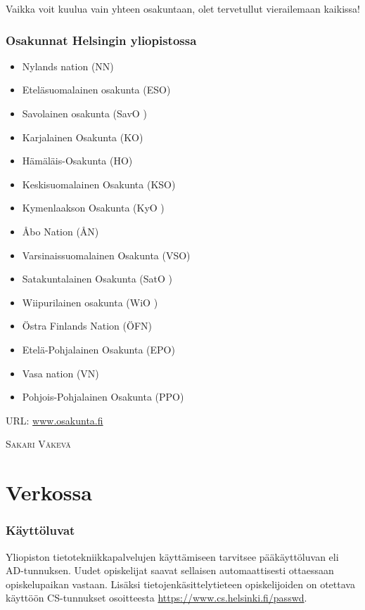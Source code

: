 \documentclass[a5paper, 8pt, twocolumn]{book} %
\numberwithin{equation}{section}
\begin{document}
Vaikka voit kuulua vain yhteen osakuntaan, olet tervetullut vierailemaan kaikissa!

\subsection*{Osakunnat Helsingin yliopistossa}
\begin{itemize}
	\item Nylands nation (NN)
	\item Eteläsuomalainen osakunta (ESO)
	\item Savolainen osakunta (SavO )
	\item Karjalainen Osakunta (KO)
	\item Hämäläis-Osakunta (HO)
	\item Keskisuomalainen Osakunta (KSO)
	\item Kymenlaakson Osakunta (KyO )
	\item Åbo Nation (ÅN)
	\item Varsinaissuomalainen Osakunta (VSO)
	\item Satakuntalainen Osakunta (SatO )
	\item Wiipurilainen osakunta (WiO )
	\item Östra Finlands Nation (ÖFN)
	\item Etelä-Pohjalainen Osakunta (EPO)
	\item Vasa nation (VN)
	\item Pohjois-Pohjalainen Osakunta (PPO)
\end{itemize}

\noindent URL: \url{www.osakunta.fi}

\vspace{0.5cm}\noindent\textsc{Sakari Väkevä}
\chapter{Verkossa}
\begin{figure}[!b]\end{figure}
\subsection*{Käyttöluvat}
Yliopiston tieto\-tekniikka\-palvelujen käyttämiseen
tarvitsee pää\-käyttö\-luvan eli AD-tunnuksen. Uudet
opiskelijat saavat sellaisen automaattisesti ottaessaan opiskelu\-paikan vastaan. Lisäksi tietojen\-käsittely\-tieteen opiskelijoiden on otettava käyttöön CS-tunnukset osoitteesta \url{https://www.cs.helsinki.fi/passwd}.
\end{document}
